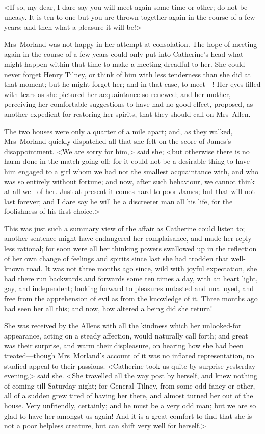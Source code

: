  <If so, my dear, I dare say you will meet again some time or other; do not be uneasy. It is ten to one but you are thrown together again in the course of a few years; and then what a pleasure it will be!> 

 Mrs~Morland was not happy in her attempt at consolation. The hope of meeting again in the course of a few years could only put into Catherine's head what might happen within that time to make a meeting dreadful to her. She could never forget Henry Tilney, or think of him with less tenderness than she did at that moment; but he might forget her; and in that case, to meet—! Her eyes filled with tears as she pictured her acquaintance so renewed; and her mother, perceiving her comfortable suggestions to have had no good effect, proposed, as another expedient for restoring her spirits, that they should call on Mrs~Allen. 

 The two houses were only a quarter of a mile apart; and, as they walked, Mrs~Morland quickly dispatched all that she felt on the score of James's disappointment. <We are sorry for him,> said she; <but otherwise there is no harm done in the match going off; for it could not be a desirable thing to have him engaged to a girl whom we had not the smallest acquaintance with, and who was so entirely without fortune; and now, after such behaviour, we cannot think at all well of her. Just at present it comes hard to poor James; but that will not last forever; and I dare say he will be a discreeter man all his life, for the foolishness of his first choice.> 

 This was just such a summary view of the affair as Catherine could listen to; another sentence might have endangered her complaisance, and made her reply less rational; for soon were all her thinking powers swallowed up in the reflection of her own change of feelings and spirits since last she had trodden that well-known road. It was not three months ago since, wild with joyful expectation, she had there run backwards and forwards some ten times a day, with an heart light, gay, and independent; looking forward to pleasures untasted and unalloyed, and free from the apprehension of evil as from the knowledge of it. Three months ago had seen her all this; and now, how altered a being did she return! 

 She was received by the Allens with all the kindness which her unlooked-for appearance, acting on a steady affection, would naturally call forth; and great was their surprise, and warm their displeasure, on hearing how she had been treated—though Mrs~Morland's account of it was no inflated representation, no studied appeal to their passions. <Catherine took us quite by surprise yesterday evening,> said she. <She travelled all the way post by herself, and knew nothing of coming till Saturday night; for General Tilney, from some odd fancy or other, all of a sudden grew tired of having her there, and almost turned her out of the house. Very unfriendly, certainly; and he must be a very odd man; but we are so glad to have her amongst us again! And it is a great comfort to find that she is not a poor helpless creature, but can shift very well for herself.> 

